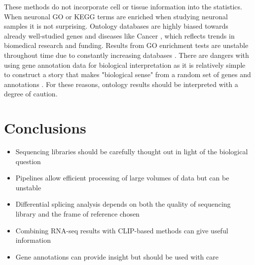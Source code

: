 These methods do not incorporate cell or tissue information into the statistics. When neuronal GO or KEGG terms are enriched when studying neuronal samples it is not surprising.
Ontology databases are highly biased towards already well-studied genes and diseases like Cancer \citep{Haynes2018}, which reflects trends in biomedical research and funding. 
Results from GO enrichment tests are unstable throughout time due to constantly increasing databases \citep{Tomczak2018}.
There are dangers with using gene annotation data for biological interpretation as it is relatively simple to construct a story that makes "biological sense" from a random set of genes and annotations \citep{Pavlidis2012}.
For these reasons, ontology results should be interpreted with a degree of caution.


\section{Conclusions}

\begin{itemize}
	\item Sequencing libraries should be carefully thought out in light of the biological question
	\item Pipelines allow efficient processing of large volumes of data but can be unstable
	\item Differential splicing analysis depends on both the quality of sequencing library and the frame of reference chosen 
	\item Combining RNA-seq results with CLIP-based methods can give useful information
	\item Gene annotations can provide insight but should be used with care
\end{itemize}










